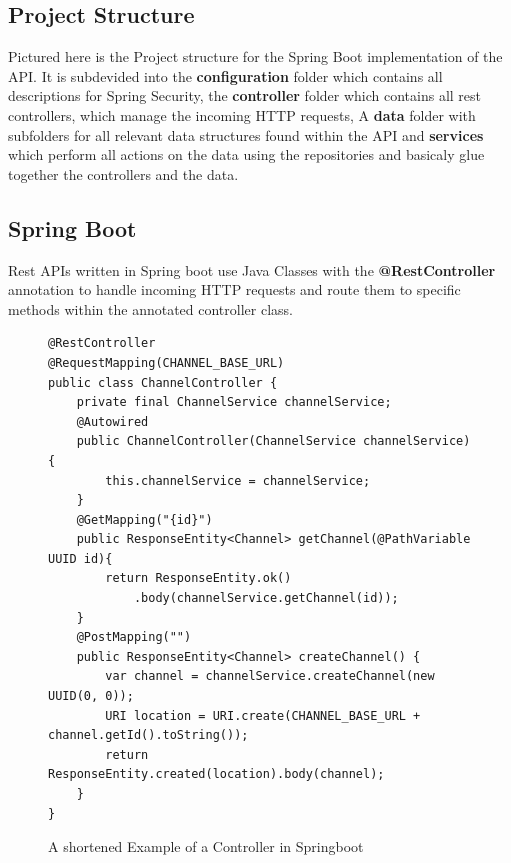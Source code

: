 \documentclass[a4paper,12pt]{article}
\begin{document}
	\subsection{Project Structure}
	\label{subsec:project_structure_java}
	\begin{minipage}{0.4\textwidth}
	\clearpage
	\end{minipage}%
	\begin{minipage}{0.6\textwidth}
		Pictured here is the Project structure for the Spring Boot implementation of the API. It is subdevided into the 
		\textbf{configuration} folder which contains all descriptions for Spring Security, the 
		\textbf{controller} folder which contains all rest controllers, which manage the incoming HTTP requests, A
		\textbf{data} folder with subfolders for all relevant data structures found within the API and
		\textbf{services} which perform all actions on the data using the repositories and basicaly glue together
		the controllers and the data.
	\end{minipage}%
	
	\newpage
	\subsection{Spring Boot}
	\label{subsec:spring_boot}
	Rest APIs written in Spring boot use Java Classes with the \textbf{@RestController} annotation to
	handle incoming HTTP requests and route them to specific methods within the annotated controller class.
	\begin{figure}[ht!]
		\begin{lstlisting}
@RestController
@RequestMapping(CHANNEL_BASE_URL)
public class ChannelController {
	private final ChannelService channelService;
	@Autowired
	public ChannelController(ChannelService channelService) {
		this.channelService = channelService;
	}
	@GetMapping("{id}")
	public ResponseEntity<Channel> getChannel(@PathVariable UUID id){
		return ResponseEntity.ok()
			.body(channelService.getChannel(id));
	}
	@PostMapping("")
    public ResponseEntity<Channel> createChannel() {
        var channel = channelService.createChannel(new UUID(0, 0));
        URI location = URI.create(CHANNEL_BASE_URL + channel.getId().toString());
        return ResponseEntity.created(location).body(channel);
    }
}
		\end{lstlisting}
		\caption[controller java shortened]{A shortened Example of a Controller in Springboot}
	\end{figure}
\end{document}
